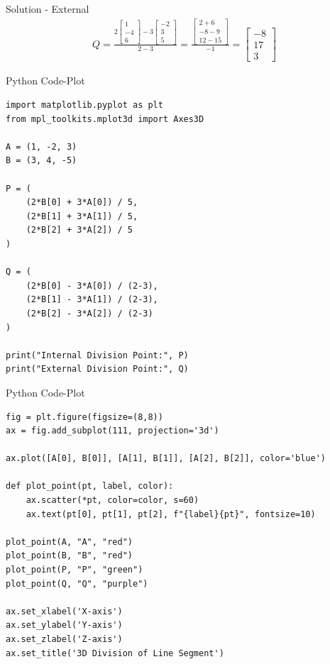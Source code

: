 \documentclass{beamer}
\begin{document}
\begin{frame}{Solution - External}
\begin{align}
Q = \frac{2 \begin{bmatrix} 1 \\ -4 \\ 6 \end{bmatrix} - 3 \begin{bmatrix} -2 \\ 3 \\ 5 \end{bmatrix}}{2 - 3}
= \frac{\begin{bmatrix} 2 + 6 \\ -8 - 9 \\ 12 - 15 \end{bmatrix}}{-1}
= \begin{bmatrix} -8 \\ 17 \\ 3 \end{bmatrix}
\end{align}
\end{frame}

\begin{frame}[fragile]{Python Code-Plot}
\begin{lstlisting}
import matplotlib.pyplot as plt
from mpl_toolkits.mplot3d import Axes3D

A = (1, -2, 3)
B = (3, 4, -5)

P = (
    (2*B[0] + 3*A[0]) / 5,
    (2*B[1] + 3*A[1]) / 5,
    (2*B[2] + 3*A[2]) / 5
)

Q = (
    (2*B[0] - 3*A[0]) / (2-3),
    (2*B[1] - 3*A[1]) / (2-3),
    (2*B[2] - 3*A[2]) / (2-3)
)

print("Internal Division Point:", P)
print("External Division Point:", Q)
\end{lstlisting}
\end{frame}

\begin{frame}[fragile]{Python Code-Plot}
\begin{lstlisting}
fig = plt.figure(figsize=(8,8))
ax = fig.add_subplot(111, projection='3d')

ax.plot([A[0], B[0]], [A[1], B[1]], [A[2], B[2]], color='blue')

def plot_point(pt, label, color):
    ax.scatter(*pt, color=color, s=60)
    ax.text(pt[0], pt[1], pt[2], f"{label}{pt}", fontsize=10)

plot_point(A, "A", "red")
plot_point(B, "B", "red")
plot_point(P, "P", "green")
plot_point(Q, "Q", "purple")

ax.set_xlabel('X-axis')
ax.set_ylabel('Y-axis')
ax.set_zlabel('Z-axis')
ax.set_title('3D Division of Line Segment')


\end{lstlisting}
\end{frame}
\end{document}
